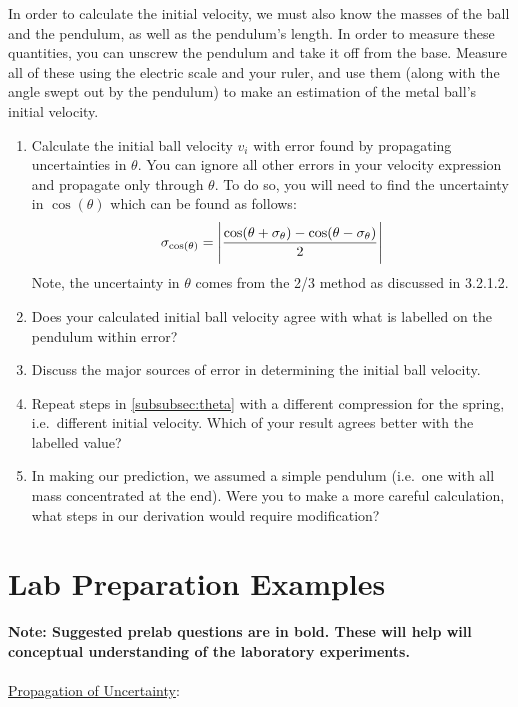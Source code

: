 In order to calculate the initial velocity, we must also know the masses of the ball and the pendulum, as well as the pendulum's length. In order to measure these quantities, you can unscrew the pendulum and take it off from the base. Measure all of these using the electric scale and your ruler, and use them (along with the angle swept out by the pendulum) to make an estimation of the metal ball's initial velocity.\myskip

\begin{enumerate}
    \item Calculate the initial ball velocity $v_{i}$ with error found by propagating uncertainties in $\theta$. You can ignore all other errors in your velocity expression and propagate only through $\theta$. To do so, you will need to find the uncertainty in $\cos(\theta)$ which can be found as follows:
\begin{gather}
\sigma_{\cos(\theta)} = \Bigg{|}\frac{\cos(\theta + \sigma_\theta) - \cos(\theta - \sigma_\theta)}{2} \Bigg{|}
\end{gather}
Note, the uncertainty in $\theta$ comes from the 2/3 method as discussed in 3.2.1.2.
\item Does your calculated initial ball velocity agree with what is labelled on the pendulum within error?
\item Discuss the major sources of error in determining the initial ball velocity.
    \item Repeat steps in \ref{subsubsec:theta} with a different compression for the spring, i.e.\ different initial velocity. Which of your result agrees better with the labelled value? %
    \item In making our prediction, we assumed a simple pendulum (i.e.\ one with all mass concentrated at the end).  Were you to make a more careful calculation, what steps in our derivation would require modification?
\end{enumerate}

\section{Lab Preparation Examples}
{\bf{Note: Suggested prelab questions are in bold. These will help will conceptual understanding of the laboratory experiments.}}
\\
\\
\noindent\underline{Propagation of Uncertainty}:\myskip


